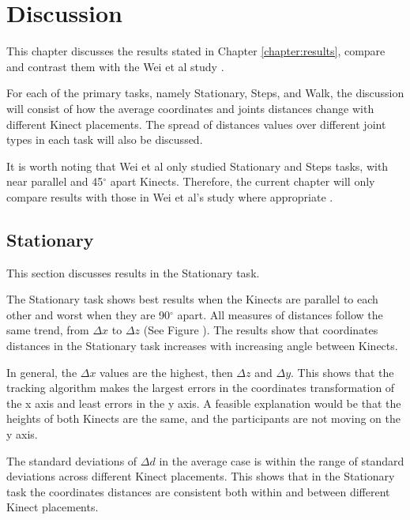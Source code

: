 


\chapter{Discussion}

\label{chapter:discussion}

This chapter discusses the results stated in Chapter \ref{chapter:results}, compare and contrast them with the Wei et al study \cite{wei_kinect_calibration}.

For each of the primary tasks, namely Stationary, Steps, and Walk, the discussion will consist of how the average coordinates and joints distances change with different Kinect placements. The spread of distances values over different joint types in each task will also be discussed.

It is worth noting that Wei et al only studied Stationary and Steps tasks, with near parallel and 45$^{\circ}$ apart Kinects. Therefore, the current chapter will only compare results with those in Wei et al's study where appropriate \cite{wei_kinect_calibration}.

\section{Stationary}
\label{sec:discussion_stationary}

This section discusses results in the Stationary task.

The Stationary task shows best results when the Kinects are parallel to each other and worst when they are 90$^{\circ}$ apart. All measures of distances follow the same trend, from $\Delta x$ to $\Delta z$ (See Figure ). The results show that coordinates distances in the Stationary task increases with increasing angle between Kinects.

In general, the $\Delta x$ values are the highest, then $\Delta z$ and $\Delta y$. This shows that the tracking algorithm makes the largest errors in the coordinates transformation of the x axis and least errors in the y axis. A feasible explanation would be that the heights of both Kinects are the same, and the participants are not moving on the y axis.

The standard deviations of $\Delta d$ in the average case is within the range of standard deviations across different Kinect placements. This shows that in the Stationary task the coordinates distances are consistent both within and between different Kinect placements.


